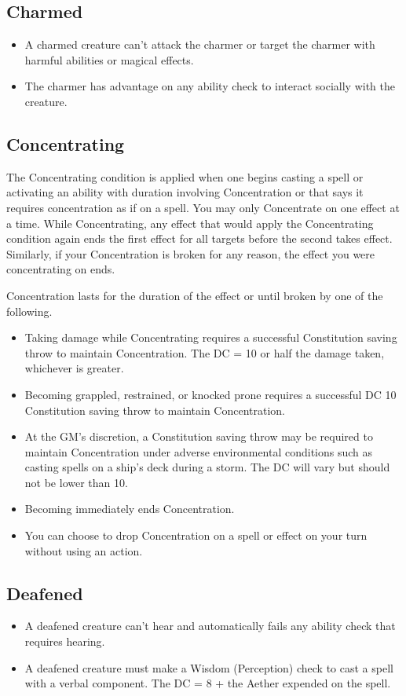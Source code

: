 \subsection{Charmed\label{condition:charmed}}
\begin{itemize}
\item A charmed creature can't attack the charmer or target the charmer with harmful abilities or magical effects.
\item The charmer has advantage on any ability check to interact socially with the creature.
\end{itemize}

\subsection{Concentrating\label{condition:concentrating}}
The Concentrating condition is applied when one begins casting a spell or activating an ability with duration involving Concentration or that says it requires concentration as if on a spell. You may only Concentrate on one effect at a time. While Concentrating, any effect that would apply the Concentrating condition again ends the first effect for all targets before the second takes effect. Similarly, if your Concentration is broken for any reason, the effect you were concentrating on ends.

Concentration lasts for the duration of the effect or until broken by one of the following.
\begin{itemize}
	\item Taking damage while Concentrating requires a successful Constitution saving throw to maintain Concentration. The DC = 10 or half the damage taken, whichever is greater.
	\item Becoming grappled, restrained, or knocked prone requires a successful DC 10 Constitution saving throw to maintain Concentration.
	\item At the GM's discretion, a Constitution saving throw may be required to maintain Concentration under adverse environmental conditions such as casting spells on a ship's deck during a storm. The DC will vary but should not be lower than 10.
	\item Becoming  immediately ends Concentration.
	\item You can choose to drop Concentration on a spell or effect on your turn without using an action.
\end{itemize}

\subsection{Deafened\label{condition:deafened}}
\begin{itemize}
\item A deafened creature can't hear and automatically fails any ability check that requires hearing.
\item A deafened creature must make a Wisdom (Perception) check to cast a spell with a verbal component. The DC = 8 + the Aether expended on the spell.
\end{itemize}

